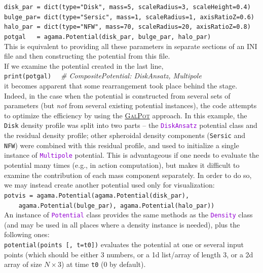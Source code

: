 \documentclass[12pt]{article}
\newcommand{\ttt}[1]{\textcolor{darkviolet}{\texttt{#1}}}
\newcommand{\ppp}[1]{\textcolor{darkolive} {\texttt{#1}}}
\begin{document}
\texttt{disk_par = dict(type="Disk", mass=5, scaleRadius=3, scaleHeight=0.4)}\\
\texttt{bulge_par= dict(type="Sersic", mass=1, scaleRadius=1, axisRatioZ=0.6)}\\
\texttt{halo_par = dict(type="NFW", mass=70, scaleRadius=20, axisRatioZ=0.8)}\\
\texttt{potgal~~~= agama.Potential(disk_par, bulge_par, halo_par)}\\
This is equivalent to providing all these parameters in separate sections of an INI file and then constructing the potential from this file.\\[2mm]
If we examine the potential created in the last line,\\
\texttt{print(potgal)}  \textit{\color{Sepia} \ \ \# CompositePotential: DiskAnsatz, Multipole}\\
it becomes apparent that some rearrangement took place behind the stage. Indeed, in the case when the potential is constructed from several sets of parameters (but \textit{not} from several existing potential instances), the code attempts to optimize the efficiency by using the \hyperref[sec:PotentialGalpot]{\textsc{GalPot}} approach. In this example, the \ppp{Disk} density profile was split into two parts -- the \ttt{DiskAnsatz} potential class and the residual density profile; other spheroidal density components (\ppp{Sersic} and \ppp{NFW}) were combined with this residual profile, and used to initialize a single instance of \ttt{Multipole} potential. This is advantageous if one needs to evaluate the potential many times (e.g., in action computation), but makes it difficult to examine the contribution of each mass component separately. In order to do so, we may instead create another potential used only for visualization:\\
\texttt{potvis~= agama.Potential(agama.Potential(disk_par), }\\
\texttt{\mbox{}~~~~agama.Potential(bulge_par), agama.Potential(halo_par))}\\[2mm]
An instance of \ttt{Potential} class provides the same methods as the \ttt{Density} class (and may be used in all places where a density instance is needed), plus the following ones:\\[2mm]
\texttt{potential(points [, t=t0])} evaluates the potential at one or several input points (which should be either 3 numbers, or a 1d list/array of length 3, or a 2d array of size $N\times3$) at time \texttt{t0} (0 by default).\\[2mm]
\end{document}
